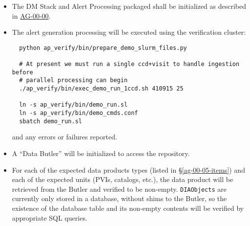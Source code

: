 \begin{itemize}

  \item{The DM Stack and Alert Processing packaged shall be initialized 
  as described in \hyperref[ag-00-00]{AG-00-00}.}

  \item{The alert generation processing will be executed using the verification cluster:

  \begin{verbatim}
  python ap_verify/bin/prepare_demo_slurm_files.py

  # At present we must run a single ccd+visit to handle ingestion before 
  # parallel processing can begin
  ./ap_verify/bin/exec_demo_run_1ccd.sh 410915 25

  ln -s ap_verify/bin/demo_run.sl
  ln -s ap_verify/bin/demo_cmds.conf
  sbatch demo_run.sl
  \end{verbatim}

  and any errors or failures reported.}


  \item{A ``Data Butler'' will be initialized to access the repository.}

  \item{For each of the expected data products types (listed in \S\ref{ag-00-05-items})
  and each of the expected units (PVIs, catalogs, etc.), the data product will be
	retrieved from the Butler and verified to be non-empty.  
	\texttt{DIAObjects} are currently only stored in a database, without 
	shims to the Butler, so the existence of the database table and its 
		non-empty contents will be verified by appropriate SQL queries.}

\end{itemize}

